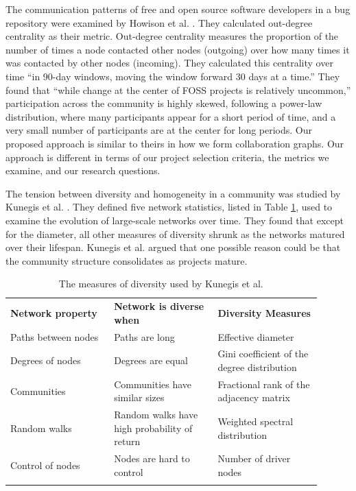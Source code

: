 \documentclass{acm_proc_article-sp}
\begin{document}
The communication patterns of free and open source software developers in a bug repository were examined by Howison et al. \cite{HowisonSocialDynamics}. They calculated out-degree centrality as their metric. Out-degree centrality measures the proportion of the number of times a node contacted other nodes (outgoing) over how many times it was contacted by other nodes (incoming). They calculated this centrality over time ``in 90-day windows, moving the window forward 30 days at a time.'' They found that ``while change at the center of FOSS projects is relatively uncommon,'' participation across the community is highly skewed, following a power-law distribution, where many participants appear for a short period of time, and a very small number of participants are at the center for long periods. Our proposed approach is similar to theirs in how we form collaboration graphs. Our approach is different in terms of our project selection criteria, the metrics we examine, and our research questions.

The tension between diversity and homogeneity in a community was studied by Kunegis et al. \cite{Kunegis}. They defined five network statistics, listed in Table \ref{TableDiversityMeasuresKunegisEtAl}, used to examine the evolution of large-scale networks over time. They found that except for the diameter, all other measures of diversity shrunk as the networks matured over their lifespan. Kunegis et al. \cite{Kunegis} argued that one possible reason could be that the community structure consolidates as projects mature.

\begin{table}[!htbp]
\centering
\caption{The measures of diversity used by Kunegis et al. \cite{Kunegis}}
\label{TableDiversityMeasuresKunegisEtAl}
\begin{tabular}{p{0.3\linewidth} p{0.3\linewidth} p{0.3\linewidth}}
\hline\noalign{\smallskip}
\textbf{Network property} & \textbf{Network is diverse when} & \textbf{Diversity Measures} \\
\noalign{\smallskip}\hline\noalign{\smallskip}
Paths between nodes & Paths are long & Effective diameter \\ \hline
Degrees of nodes  & Degrees are equal & Gini coefficient of the degree distribution \\ \hline
Communities  & Communities have similar sizes & Fractional rank of the adjacency matrix \\ \hline
Random walks  & Random walks have high probability of return & Weighted spectral distribution \\ \hline
Control of nodes  & Nodes are hard to control & Number of driver nodes \\
\noalign{\smallskip}\hline
\end{tabular}
\end{table}
\end{document}
